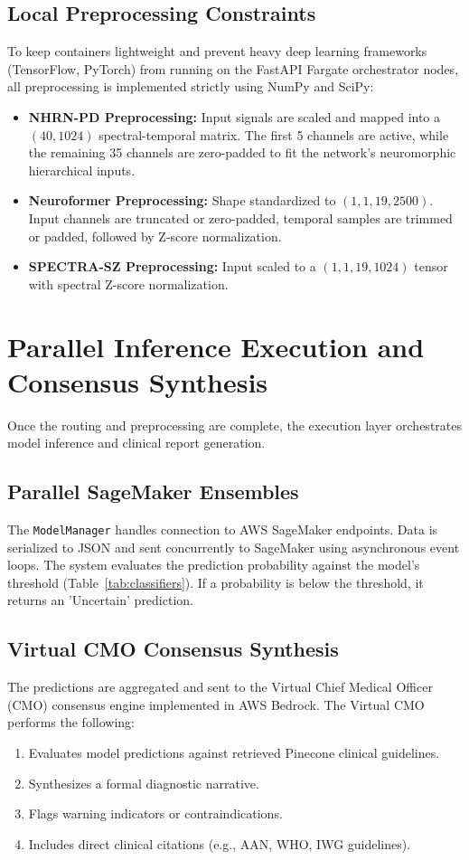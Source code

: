 \documentclass[runningheads]{llncs}
\begin{document}
\subsection{Local Preprocessing Constraints}
To keep containers lightweight and prevent heavy deep learning frameworks (TensorFlow, PyTorch) from running on the FastAPI Fargate orchestrator nodes, all preprocessing is implemented strictly using NumPy and SciPy:
\begin{itemize}
    \item \textbf{NHRN-PD Preprocessing:} Input signals are scaled and mapped into a $(40, 1024)$ spectral-temporal matrix. The first 5 channels are active, while the remaining 35 channels are zero-padded to fit the network's neuromorphic hierarchical inputs.
    \item \textbf{Neuroformer Preprocessing:} Shape standardized to $(1, 1, 19, 2500)$. Input channels are truncated or zero-padded, temporal samples are trimmed or padded, followed by Z-score normalization.
    \item \textbf{SPECTRA-SZ Preprocessing:} Input scaled to a $(1, 1, 19, 1024)$ tensor with spectral Z-score normalization.
\end{itemize}

\section{Parallel Inference Execution and Consensus Synthesis}
Once the routing and preprocessing are complete, the execution layer orchestrates model inference and clinical report generation.

\subsection{Parallel SageMaker Ensembles}
The \texttt{ModelManager} handles connection to AWS SageMaker endpoints. Data is serialized to JSON and sent concurrently to SageMaker using asynchronous event loops. The system evaluates the prediction probability against the model's threshold (Table~\ref{tab:classifiers}). If a probability is below the threshold, it returns an 'Uncertain' prediction.

\subsection{Virtual CMO Consensus Synthesis}
The predictions are aggregated and sent to the Virtual Chief Medical Officer (CMO) consensus engine implemented in AWS Bedrock. The Virtual CMO performs the following:
\begin{enumerate}
    \item Evaluates model predictions against retrieved Pinecone clinical guidelines.
    \item Synthesizes a formal diagnostic narrative.
    \item Flags warning indicators or contraindications.
    \item Includes direct clinical citations (e.g., AAN, WHO, IWG guidelines).
\end{enumerate}
\end{document}
